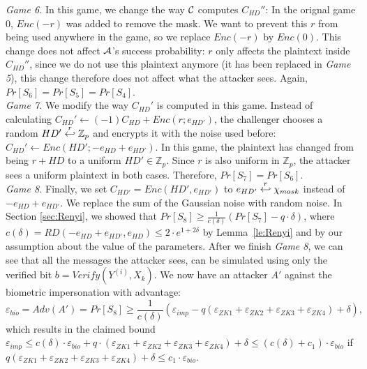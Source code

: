 \textit{Game 6.} In this game, we change the way $\mathcal{C}$ computes $C_{HD}''$: In the orignal game 0, $Enc(-r)$ was
added to remove the mask. We want to prevent this $r$ from being used anywhere in the game, so we replace $Enc(-r)$ by
$Enc(0)$. This change does not affect $\mathcal{A}$'s success probability: $r$ only affects the plaintext inside
$C_{HD}''$, since we do not use this plaintext anymore (it has been replaced in \textit{Game 5}), this change therefore
does not affect what the attacker sees. Again, $Pr[S_6] = Pr[S_5] = Pr[S_4]$.\\
\textit{Game 7.} We modify the way $C_{HD}'$ is computed in this game. Instead of calculating
$C_{HD}' \gets (-1)C_{HD} + Enc(r;e_{HD'})$, the challenger chooses a random $HD' \stackrel{r}{\hookleftarrow} \mathbb{Z}_p$ and
encrypts it with the noise used before: $C_{HD}' \gets Enc(HD'; -e_{HD} + e_{HD'})$. In this game, the plaintext has
changed from being $r + HD$ to a uniform $HD' \in \mathbb{Z}_p$.  Since $r$ is also uniform in $\mathbb{Z}_p$, the
attacker sees a uniform
plaintext in both cases. Therefore, $Pr[S_7] = Pr[S_6]$.\\
\textit{Game 8.} Finally, we set $C_{HD'} = Enc(HD', e_{HD'})$ to $e_{HD'} \stackrel{r}{\hookleftarrow} \chi_{mask}$ instead of
$-e_{HD} + e_{HD'}$. We replace the sum of the Gaussian noise with random noise. In Section \ref{sec:Renyi}, we
showed that $Pr[S_8] \geq \frac{1}{c(\delta)}(Pr[S_7]-q \cdot \delta)$, where
$c(\delta) = RD(-e_{HD} + e_{HD'}, e_{HD}) \leq 2 \cdot e^{1+2\delta}$ by Lemma~\ref{le:Renyi} and by our assumption about the value of the
parameters. After we finish \textit{Game 8}, we can see that all the messages the attacker sees, can be simulated
using only the verified bit $b = Verify(Y^{(i)}, X_k)$. We now have an attacker $A'$ against the biometric impersonation
with advantage:
\[
\varepsilon_{bio} = Adv(A') = Pr[S_8] \geq \frac{1}{c(\delta)}(\varepsilon_{imp} - q(\varepsilon_{ZK1}+\varepsilon_{ZK2} +
\varepsilon_{ZK3} + \varepsilon_{ZK4}) + \delta),
\]
which results in the claimed bound $\varepsilon_{imp} \leq c(\delta) \cdot \varepsilon_{bio} + q \cdot (\varepsilon_{ZK1}+\varepsilon_{ZK2} +
\varepsilon_{ZK3} + \varepsilon_{ZK4}) + \delta \leq (c(\delta)+c_1) \cdot \varepsilon_{bio}$ if $q(\varepsilon_{ZK1}+\varepsilon_{ZK2} +
\varepsilon_{ZK3} + \varepsilon_{ZK4}) + \delta \leq c_1 \cdot \varepsilon_{bio}$.


